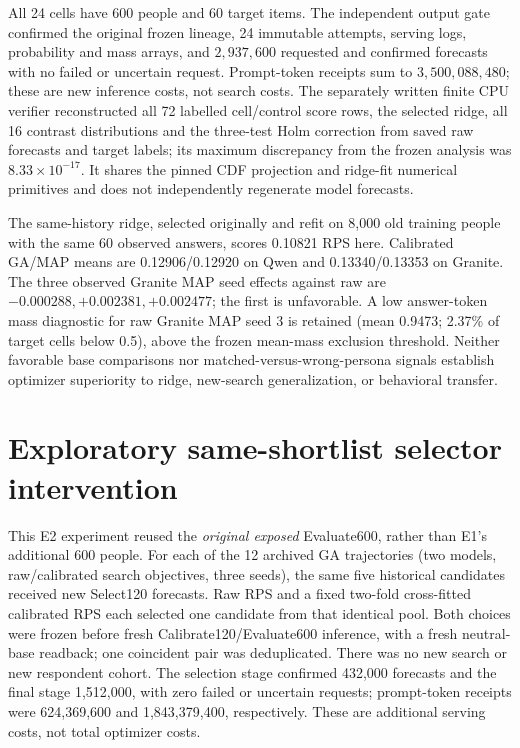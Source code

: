 \documentclass[sigconf,anonymous]{aamas}
\begin{document}
All 24 cells have 600 people and 60 target items. The independent output gate
confirmed the original frozen lineage, 24 immutable attempts, serving logs,
probability and mass arrays, and $2{,}937{,}600$ requested and confirmed
forecasts with no failed or uncertain request. Prompt-token receipts sum to
$3{,}500{,}088{,}480$; these are new inference costs, not search costs.
The separately written finite CPU verifier reconstructed all 72 labelled
cell/control score rows, the selected ridge, all 16 contrast distributions
and the three-test Holm correction from saved raw forecasts and target labels;
its maximum discrepancy from the frozen analysis was
$8.33\times10^{-17}$. It shares the pinned CDF projection and ridge-fit
numerical primitives and does not independently regenerate model forecasts.

The same-history ridge, selected originally and refit on 8,000 old training
people with the same 60 observed answers, scores 0.10821 RPS here. Calibrated
GA/MAP means are 0.12906/0.12920 on Qwen and 0.13340/0.13353 on Granite.
The three observed Granite MAP seed effects against raw are
$-0.000288,+0.002381,+0.002477$; the first is unfavorable. A low answer-token
mass diagnostic for raw Granite MAP seed 3 is retained (mean 0.9473; 2.37\%
of target cells below 0.5), above the frozen mean-mass exclusion threshold.
Neither favorable base comparisons nor matched-versus-wrong-persona signals
establish optimizer superiority to ridge, new-search generalization, or
behavioral transfer.

\section{Exploratory same-shortlist selector intervention}
This E2 experiment reused the \emph{original exposed} Evaluate600, rather
than E1's additional 600 people. For each of the 12 archived GA trajectories
(two models, raw/calibrated search objectives, three seeds), the same five
historical candidates received new Select120 forecasts. Raw RPS and a fixed
two-fold cross-fitted calibrated RPS each selected one candidate from that
identical pool. Both choices were frozen before fresh Calibrate120/Evaluate600
inference, with a fresh neutral-base readback; one coincident pair was
deduplicated. There was no new search or new respondent cohort. The selection
stage confirmed 432,000 forecasts and the final stage 1,512,000, with zero
failed or uncertain requests; prompt-token receipts were 624,369,600 and
1,843,379,400, respectively. These are additional serving costs, not total
optimizer costs.
\end{document}

